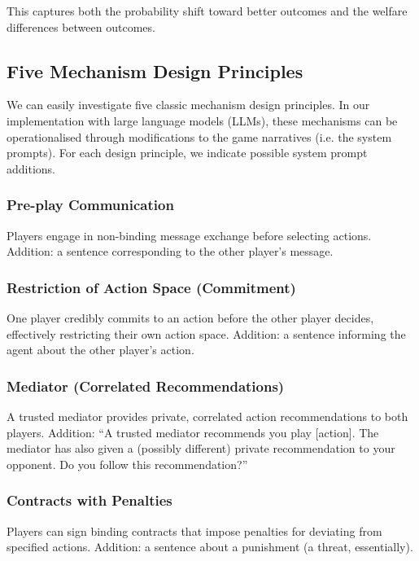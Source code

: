 \documentclass[11pt]{amsart}
\begin{document}
This captures both the probability shift toward better outcomes and the welfare differences between outcomes.

\subsection{Five Mechanism Design Principles}

We can easily investigate five classic mechanism design principles. In our implementation with large language models (LLMs), these mechanisms can be operationalised through modifications to the game narratives (i.e. the system prompts). For each design principle, we indicate possible system prompt additions.

\subsubsection{Pre-play Communication}

Players engage in non-binding message exchange before selecting actions. Addition: a sentence corresponding to the other player's message.

\subsubsection{Restriction of Action Space (Commitment)}

One player credibly commits to an action before the other player decides, effectively restricting their own action space. Addition: a sentence informing the agent about the other player's action.

\subsubsection{Mediator (Correlated Recommendations)}

A trusted mediator provides private, correlated action recommendations to both players. Addition: ``A trusted mediator recommends you play [action]. The mediator has also given a (possibly different) private recommendation to your opponent. Do you follow this recommendation?''

\subsubsection{Contracts with Penalties}

Players can sign binding contracts that impose penalties for deviating from specified actions. Addition: a sentence about a punishment (a threat, essentially).
\end{document}
